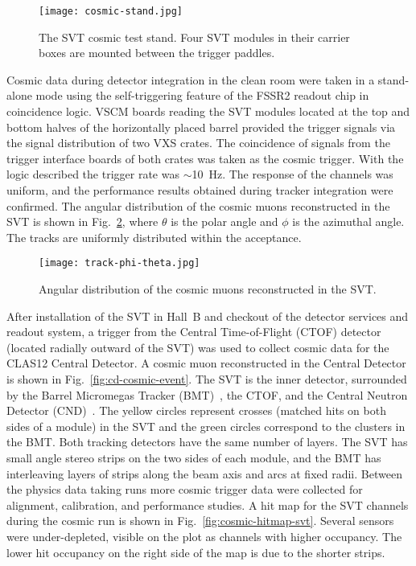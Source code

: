 \begin{figure}[hbt] 
\centering 
\texttt{[image: cosmic-stand.jpg]}
\caption{The SVT cosmic test stand. Four SVT modules in their carrier boxes are mounted between the trigger
  paddles.}
\label{fig:cosmic-stand}
\end{figure}

Cosmic data during detector integration in the clean room were taken in a stand-alone mode using the
self-triggering feature of the FSSR2 readout chip in coincidence logic. VSCM boards reading the SVT modules
located at the top and bottom halves of the horizontally placed barrel provided the trigger signals via the signal
distribution of two VXS crates. The coincidence of  signals from the trigger interface boards of both crates was
taken as the cosmic trigger. With the logic described the trigger rate was $\sim$10~Hz. The response of the
channels was uniform, and the performance results obtained during tracker integration were confirmed. The
angular distribution of the cosmic muons reconstructed in the SVT is shown in Fig.~\ref{fig:track-phi-theta}, where
$\theta$ is the polar angle and $\phi$ is the azimuthal angle. The tracks are uniformly distributed within the
acceptance.

\begin{figure}[hbt] 
\centering 
\texttt{[image: track-phi-theta.jpg]}
\caption{Angular distribution of the cosmic muons reconstructed in the SVT.}
\label{fig:track-phi-theta}
\end{figure}

After installation of the SVT in Hall~B and checkout of the detector services and readout system, a trigger
from the Central Time-of-Flight (CTOF) detector~\cite{ctof-nim} (located radially outward of the SVT) was
used to collect cosmic data for the CLAS12 Central Detector. A cosmic muon reconstructed in the Central
Detector is shown in Fig.~\ref{fig:cd-cosmic-event}. The SVT is the inner detector, surrounded by the Barrel
Micromegas Tracker (BMT)~\cite{mm-nim}, the CTOF, and the Central Neutron Detector (CND)~\cite{cnd-nim}.
The yellow circles represent crosses (matched hits on both sides of a module) in the SVT and the green circles
correspond to the clusters in the BMT. Both tracking detectors have the same number of layers. The SVT has
small angle stereo strips on the two sides of each module, and the BMT has interleaving layers of strips along
the beam axis and arcs at fixed radii. Between the physics data taking runs more cosmic trigger data were
collected for alignment, calibration, and performance studies.  A hit map for the SVT channels during the cosmic
run is shown in Fig.~\ref{fig:cosmic-hitmap-svt}. Several sensors were under-depleted, visible on the plot as
channels with higher occupancy. The lower hit occupancy on the right side of the map is due to the shorter strips. 

